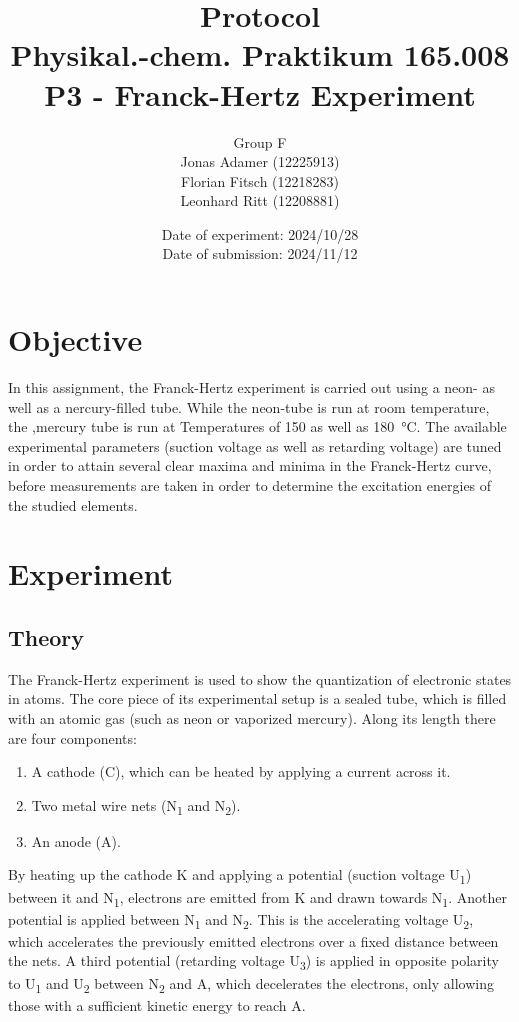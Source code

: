 \documentclass[titlepage]{article}
\title{Protocol \\ Physikal.-chem. Praktikum 165.008 \\ P3 - Franck-Hertz Experiment}
\author{Group F\\Jonas Adamer (12225913)\\Florian Fitsch (12218283)\\Leonhard Ritt (12208881)}
\date{Date of experiment: 2024/10/28\\Date of submission: 2024/11/12}
\begin{document}
\maketitle
\thispagestyle{empty}

\newpage
\tableofcontents
\thispagestyle{empty}

\addtocounter{page}{-1}

\newpage
\section{Objective}
In this assignment, the Franck-Hertz experiment is carried out using a neon- as well as a nercury-filled tube. While the neon-tube is run at room temperature, the ,mercury tube is run at Temperatures of 150 as well as 180~°C. The available experimental parameters (suction voltage as well as retarding voltage) are tuned in order to attain several clear maxima and minima in the Franck-Hertz curve, before measurements are taken in order to determine the excitation energies of the studied elements.

\section{Experiment}
\subsection{Theory}
The Franck-Hertz experiment is used to show the quantization of electronic states in atoms. The core piece of its experimental setup is a sealed tube, which is filled with an atomic gas (such as neon or vaporized mercury). Along its length there are four components:
%
\begin{enumerate}
    \itemsep0em
    \item A cathode (C), which can be heated by applying a current across it.
    \item Two metal wire nets (N\textsubscript{1} and N\textsubscript{2}).
    \item An anode (A).
\end{enumerate}

By heating up the cathode K and applying a potential (suction voltage U\textsubscript{1}) between it and N\textsubscript{1}, electrons are emitted from K and drawn towards N\textsubscript{1}. Another potential is applied between N\textsubscript{1} and N\textsubscript{2}. This is the accelerating voltage U\textsubscript{2}, which accelerates the previously emitted electrons over a fixed distance between the nets. A third potential (retarding voltage U\textsubscript{3}) is applied in opposite polarity to U\textsubscript{1} and U\textsubscript{2} between N\textsubscript{2} and A, which decelerates the electrons, only allowing those with a sufficient kinetic energy to reach A.
\end{document}
